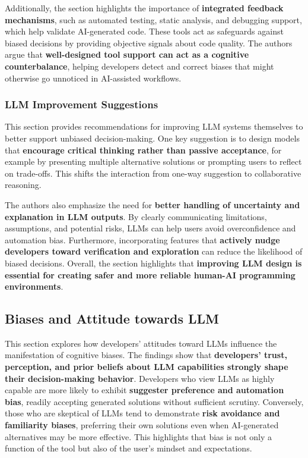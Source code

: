 Additionally, the section highlights the importance of \textbf{integrated feedback mechanisms}, such as automated testing, static analysis, and debugging support, which help validate AI-generated code. These tools act as safeguards against biased decisions by providing objective signals about code quality. The authors argue that \textbf{well-designed tool support can act as a cognitive counterbalance}, helping developers detect and correct biases that might otherwise go unnoticed in AI-assisted workflows.

\subsubsection{LLM Improvement Suggestions}
This section provides recommendations for improving LLM systems themselves to better support unbiased decision-making. One key suggestion is to design models that \textbf{encourage critical thinking rather than passive acceptance}, for example by presenting multiple alternative solutions or prompting users to reflect on trade-offs. This shifts the interaction from one-way suggestion to collaborative reasoning.

The authors also emphasize the need for \textbf{better handling of uncertainty and explanation in LLM outputs}. By clearly communicating limitations, assumptions, and potential risks, LLMs can help users avoid overconfidence and automation bias. Furthermore, incorporating features that \textbf{actively nudge developers toward verification and exploration} can reduce the likelihood of biased decisions. Overall, the section highlights that \textbf{improving LLM design is essential for creating safer and more reliable human-AI programming environments}.

\subsection{Biases and Attitude towards LLM}
This section explores how developers’ attitudes toward LLMs influence the manifestation of cognitive biases. The findings show that \textbf{developers’ trust, perception, and prior beliefs about LLM capabilities strongly shape their decision-making behavior}. Developers who view LLMs as highly capable are more likely to exhibit \textbf{suggester preference and automation bias}, readily accepting generated solutions without sufficient scrutiny. Conversely, those who are skeptical of LLMs tend to demonstrate \textbf{risk avoidance and familiarity biases}, preferring their own solutions even when AI-generated alternatives may be more effective. This highlights that bias is not only a function of the tool but also of the user’s mindset and expectations.

